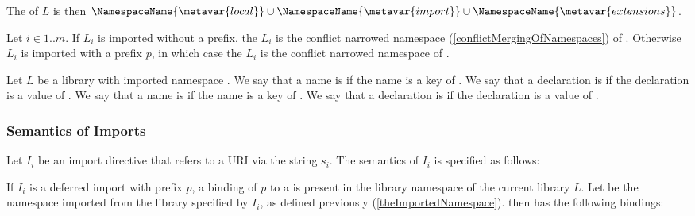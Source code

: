 \documentclass[makeidx]{article}
\begin{document}
{

\LMHash{}%
The  of $L$ is then
$\NamespaceName{\metavar{local}} \cup
\NamespaceName{\metavar{import}} \cup
\NamespaceName{\metavar{extensions}}$.

\LMHash{}%
Let $i \in 1 .. m$.
If $L_i$ is imported without a prefix, the
$L_i$ is the conflict narrowed namespace
(\ref{conflictMergingOfNamespaces})
of .
%
Otherwise $L_i$ is imported with a prefix $p$,
in which case the  $L_i$
is the conflict narrowed namespace
of .


\LMHash{}%
Let $L$ be a library with imported namespace \NamespaceName.
We say that a name is
if the name is a key of \NamespaceName.
We say that a declaration is
if the declaration is a value of \NamespaceName.
We say that a name is
if the name is a key of .
We say that a declaration is
if the declaration is a value of .


\subsubsection{Semantics of Imports}

\LMHash{}%
Let $I_i$ be an import directive that refers to a URI via the string $s_i$.
The semantics of $I_i$ is specified as follows:

\LMHash{}%
If $I_i$ is a deferred import with prefix $p$, a binding of $p$ to a
 is
present in the library namespace of the current library $L$.
Let  be
the namespace imported from the library specified by $I_i$,
as defined previously
(\ref{theImportedNamespace}).
 then has the following bindings:

}
\end{document}
